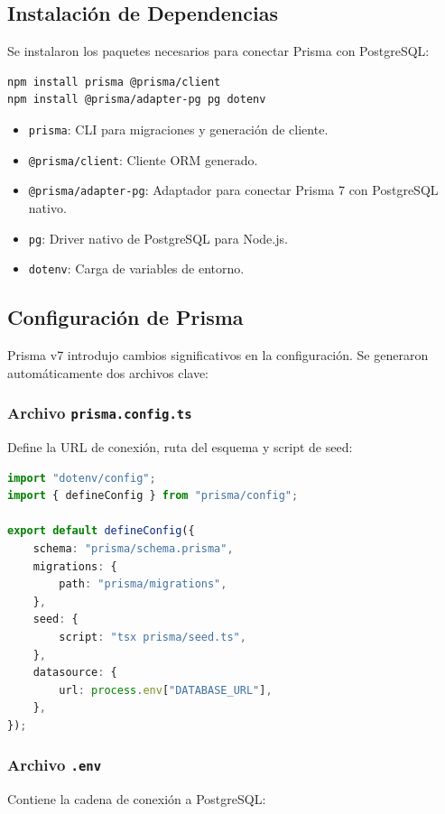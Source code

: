 \documentclass[12pt,a4paper]{article}
\begin{document}
\subsection{Instalación de Dependencias}
Se instalaron los paquetes necesarios para conectar Prisma con PostgreSQL:

\begin{lstlisting}[language=bash]
npm install prisma @prisma/client
npm install @prisma/adapter-pg pg dotenv
\end{lstlisting}

\begin{itemize}
    \item \texttt{prisma}: CLI para migraciones y generación de cliente.
    \item \texttt{@prisma/client}: Cliente ORM generado.
    \item \texttt{@prisma/adapter-pg}: Adaptador para conectar Prisma 7 con PostgreSQL nativo.
    \item \texttt{pg}: Driver nativo de PostgreSQL para Node.js.
    \item \texttt{dotenv}: Carga de variables de entorno.
\end{itemize}

\subsection{Configuración de Prisma}
Prisma v7 introdujo cambios significativos en la configuración. Se generaron automáticamente dos archivos clave:

\subsubsection{Archivo \texttt{prisma.config.ts}}
Define la URL de conexión, ruta del esquema y script de seed:

\begin{lstlisting}[language=TypeScript]
import "dotenv/config";
import { defineConfig } from "prisma/config";

export default defineConfig({
    schema: "prisma/schema.prisma",
    migrations: {
        path: "prisma/migrations",
    },
    seed: {
        script: "tsx prisma/seed.ts",
    },
    datasource: {
        url: process.env["DATABASE_URL"],
    },
});
\end{lstlisting}

\subsubsection{Archivo \texttt{.env}}
Contiene la cadena de conexión a PostgreSQL:
\end{document}
